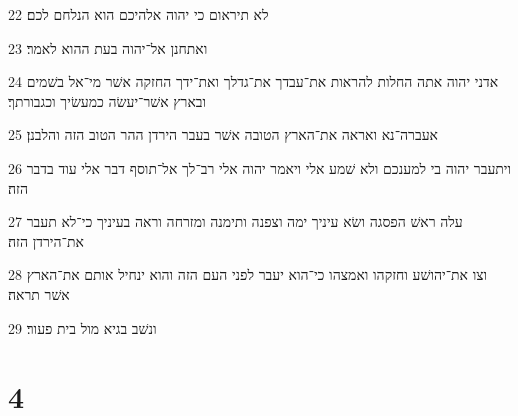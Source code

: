 \par 22 לא תיראום כי יהוה אלהיכם הוא הנלחם לכם׃
\par 23 ואתחנן אל־יהוה בעת ההוא לאמר׃
\par 24 אדני יהוה אתה החלות להראות את־עבדך את־גדלך ואת־ידך החזקה אשׁר מי־אל בשׁמים ובארץ אשׁר־יעשׂה כמעשׂיך וכגבורתך׃
\par 25 אעברה־נא ואראה את־הארץ הטובה אשׁר בעבר הירדן ההר הטוב הזה והלבנן׃
\par 26 ויתעבר יהוה בי למענכם ולא שׁמע אלי ויאמר יהוה אלי רב־לך אל־תוסף דבר אלי עוד בדבר הזה׃
\par 27 עלה ראשׁ הפסגה ושׂא עיניך ימה וצפנה ותימנה ומזרחה וראה בעיניך כי־לא תעבר את־הירדן הזה׃
\par 28 וצו את־יהושׁע וחזקהו ואמצהו כי־הוא יעבר לפני העם הזה והוא ינחיל אותם את־הארץ אשׁר תראה׃
\par 29 ונשׁב בגיא מול בית פעור׃

\chapter{4}

